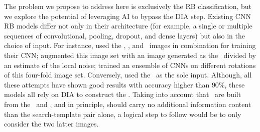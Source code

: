 The problem we propose to address here is exclusively the RB classification, but we explore the potential of leveraging AI to bypass the DIA step. 
Existing CNN RB models differ not only in their architecture (for example, a single or multiple sequences of convolutional, pooling, dropout, and dense layers) but also in the choice of input. For instance, \cite{Gieseke_2017} used the \temp, \search, and \diff\ images in combination for training their CNN; \cite{Cabrera_2016} augmented this image set with an image generated as the \diff\ divided by an estimate of the local noise;  \cite{Cabrera_Vives_2017} trained an ensemble of CNNs on different rotations of this four-fold image set. Conversely, \citet{Liu_2019} used the \diff\ as the sole input. Although, all these attempts have shown good results with accuracy higher than $90\%$, these models all rely on DIA to construct the \diff. Taking into account that \diff\ are built from the \temp\ and \search, and in principle, should carry no additional information content than the search-template pair alone, a logical step to follow would be to only consider the two latter images.  


